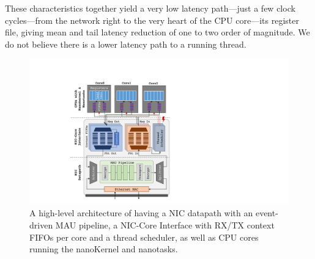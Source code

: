 These characteristics together yield a very low latency path---just a few clock cycles---from the network right to the very heart of the CPU core---its register file, giving mean and tail latency reduction of one to two order of magnitude. We do not believe there is a lower latency path to a running thread.

\begin{figure}
  \includegraphics[width=0.9\linewidth]{./figures/nanopu-arch}
  \caption{A high-level architecture of \name{} having a NIC datapath with an event-driven MAU pipeline, a NIC-Core Interface with RX/TX context FIFOs per core and a thread scheduler, as well as CPU cores running the nanoKernel and nanotasks.}
  \label{fig:nanoPU}
\end{figure}






